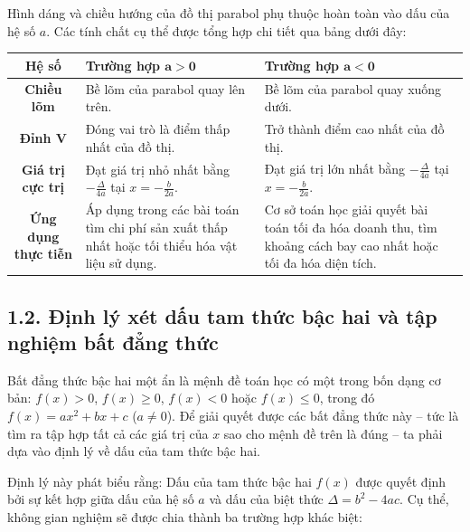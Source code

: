 \documentclass[14pt, a4paper, oneside]{extreport}
\begin{document}
Hình dáng và chiều hướng của đồ thị parabol phụ thuộc hoàn toàn vào dấu của hệ số $a$. Các tính chất cụ thể được tổng hợp chi tiết qua bảng dưới đây:
\begin{table}[htbp]
\centering
\renewcommand{\arraystretch}{1.3}
\begin{tabular}{|c|p{5.5cm}|p{5.5cm}|}
\hline
\textbf{Hệ số} & \textbf{Trường hợp $\boldsymbol{a > 0}$} & \textbf{Trường hợp $\boldsymbol{a < 0}$} \\ \hline
\textbf{Chiều lõm} & Bề lõm của parabol quay lên trên. & Bề lõm của parabol quay xuống dưới. \\ \hline
\textbf{Đỉnh $\boldsymbol{V}$} & Đóng vai trò là điểm {thấp nhất} của đồ thị. & Trở thành điểm {cao nhất} của đồ thị. \\ \hline
\textbf{Giá trị cực trị} & Đạt giá trị {nhỏ nhất} bằng $-\frac{\Delta}{4a}$ tại $x = -\frac{b}{2a}$. & Đạt giá trị {lớn nhất} bằng $-\frac{\Delta}{4a}$ tại $x = -\frac{b}{2a}$. \\ \hline
\textbf{Ứng dụng thực tiễn} & Áp dụng trong các bài toán tìm chi phí sản xuất thấp nhất hoặc tối thiểu hóa vật liệu sử dụng. & Cơ sở toán học giải quyết bài toán tối đa hóa doanh thu, tìm khoảng cách bay cao nhất hoặc tối đa hóa diện tích. \\ \hline
\end{tabular}
\end{table}

\subsection*{1.2. Định lý xét dấu tam thức bậc hai và tập nghiệm bất đẳng thức}

Bất đẳng thức bậc hai một ẩn là mệnh đề toán học có một trong bốn dạng cơ bản: $f(x) > 0$, $f(x) \ge 0$, $f(x) < 0$ hoặc $f(x) \le 0$, trong đó $f(x) = ax^2 + bx + c$ ($a \neq 0$). Để giải quyết được các bất đẳng thức này – tức là tìm ra tập hợp tất cả các giá trị của $x$ sao cho mệnh đề trên là đúng – ta phải dựa vào định lý về dấu của tam thức bậc hai.

Định lý này phát biểu rằng: Dấu của tam thức bậc hai $f(x)$ được quyết định bởi sự kết hợp giữa dấu của hệ số $a$ và dấu của biệt thức $\Delta = b^2 - 4ac$. Cụ thể, không gian nghiệm sẽ được chia thành ba trường hợp khác biệt:
\end{document}
